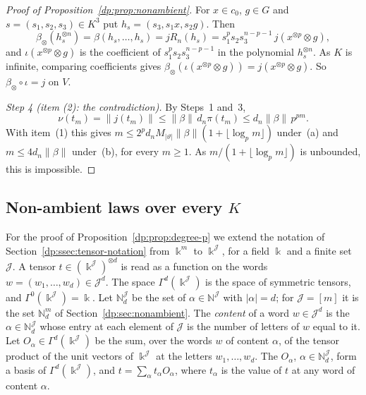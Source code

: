 \documentclass[11pt]{amsart}
\theoremstyle{definition}
\theoremstyle{remark}
\numberwithin{equation}{section}
\newcommand{\N}{\mathbb N}
\newcommand{\abs}[1]{\lvert #1\rvert}
\newcommand{\norm}[1]{\lVert #1\rVert}
\theoremstyle{plain}
\theoremstyle{definition}
\theoremstyle{plain}
\begin{document}
\begin{proof}[Proof of Proposition~\ref{dp:prop:nonambient}]
For $x\in c_0$, $g\in G$ and $s=(s_1,s_2,s_3)\in K^3$ put $h_s=(s_3,s_1x,s_2g)$. Then
\[
 \beta_\otimes(h_s^{\otimes n})=\beta(h_s,\dots,h_s)=jR_n(h_s)=s_1^ps_2s_3^{n-p-1}\,j(x^{\otimes p}\otimes g),
\]
and $\iota(x^{\otimes p}\otimes g)$ is the coefficient of $s_1^ps_2s_3^{n-p-1}$ in the polynomial $h_s^{\otimes n}$. As $K$ is infinite, comparing coefficients gives $\beta_\otimes(\iota(x^{\otimes p}\otimes g))=j(x^{\otimes p}\otimes g)$. So $\beta_\otimes\circ\iota=j$ on $V$.

\emph{Step 4 (item (2): the contradiction).} By Steps~1 and~3,
\[
 \nu(t_m)=\norm{j(t_m)}\le\norm\beta\,d_n\pi(t_m)\le d_n\norm\beta\,p^{pm}.
\]
With item~(1) this gives $m\le2^pd_nM_{\abs\vartheta}\norm\beta(1+\lfloor\log_pm\rfloor)$ under~(a) and $m\le4d_n\norm\beta$ under~(b), for every $m\ge1$. As $m/(1+\lfloor\log_pm\rfloor)$ is unbounded, this is impossible.
\end{proof}
\subsection{Non-ambient laws over every \texorpdfstring{$K$}{K}}\label{dp:ssec:degree-p}

For the proof of Proposition~\ref{dp:prop:degree-p} we extend the notation of Section~\ref{dp:ssec:tensor-notation} from $\Bbbk^m$ to $\Bbbk^{\mathcal J}$, for a field $\Bbbk$ and a finite set $\mathcal J$. A tensor $t\in(\Bbbk^{\mathcal J})^{\otimes d}$ is read as a function on the words $w=(w_1,\dots,w_d)\in\mathcal J^d$. The space $\Gamma^d(\Bbbk^{\mathcal J})$ is the space of symmetric tensors, and $\Gamma^0(\Bbbk^{\mathcal J})=\Bbbk$. Let $\N^{\mathcal J}_d$ be the set of $\alpha\in\N^{\mathcal J}$ with $\abs\alpha=d$; for $\mathcal J=[m]$ it is the set $\N^m_d$ of Section~\ref{dp:sec:nonambient}. The \emph{content} of a word $w\in\mathcal J^d$ is the $\alpha\in\N^{\mathcal J}_d$ whose entry at each element of $\mathcal J$ is the number of letters of $w$ equal to it. Let $O_\alpha\in\Gamma^d(\Bbbk^{\mathcal J})$ be the sum, over the words $w$ of content $\alpha$, of the tensor product of the unit vectors of $\Bbbk^{\mathcal J}$ at the letters $w_1,\dots,w_d$. The $O_\alpha$, $\alpha\in\N^{\mathcal J}_d$, form a basis of $\Gamma^d(\Bbbk^{\mathcal J})$, and $t=\sum_\alpha t_\alpha O_\alpha$, where $t_\alpha$ is the value of $t$ at any word of content $\alpha$.
\end{document}
